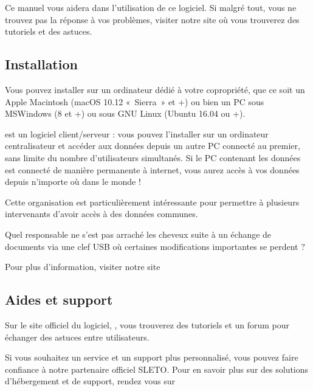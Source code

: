 \documentclass[a4paper,10pt,oneside,french]{sphinxmanual}
\begin{document}
\sphinxAtStartPar
Ce manuel vous aidera dans l’utilisation de ce logiciel.
Si malgré tout, vous ne trouvez pas la réponse à vos problèmes, visiter notre site  où vous trouverez des tutoriels et des astuces.


\subsection{Installation}
\label{\detokenize{syndic/presentation:installation}}
\sphinxAtStartPar
Vous pouvez installer  sur un ordinateur dédié à votre copropriété, que ce soit un Apple Macintosh (macOS 10.12 « Sierra » et +) ou bien un PC sous MS\sphinxhyphen{}Windows (8 et +) ou sous GNU Linux (Ubuntu 16.04 ou +).

\sphinxAtStartPar
{} est un logiciel client/serveur : vous pouvez l’installer sur un ordinateur centralisateur et accéder aux données depuis un autre PC connecté au premier, sans limite du nombre d’utilisateurs simultanés.
Si le PC contenant les données est connecté de manière permanente à internet, vous aurez accès à vos données depuis n’importe où dans le monde !

\sphinxAtStartPar
Cette organisation est particulièrement intéressante pour permettre à plusieurs intervenants d’avoir accès à des données communes.

\sphinxAtStartPar
Quel responsable ne s’est pas arraché les cheveux suite à un échange de documents via une clef USB où certaines modifications importantes se perdent ?

\sphinxAtStartPar
Pour plus d’information, visiter notre site 


\subsection{Aides et support}
\label{\detokenize{syndic/presentation:aides-et-support}}
\sphinxAtStartPar
Sur le site officiel du logiciel, , vous trouverez des tutoriels et un forum pour échanger des astuces entre utilisateurs.

\sphinxAtStartPar
Si vous souhaitez un service et un support plus personnalisé, vous pouvez faire confiance à notre partenaire officiel SLETO.
Pour en savoir plus sur des solutions d’hébergement et de support, rendez vous sur 

\sphinxstepscope
\end{document}
